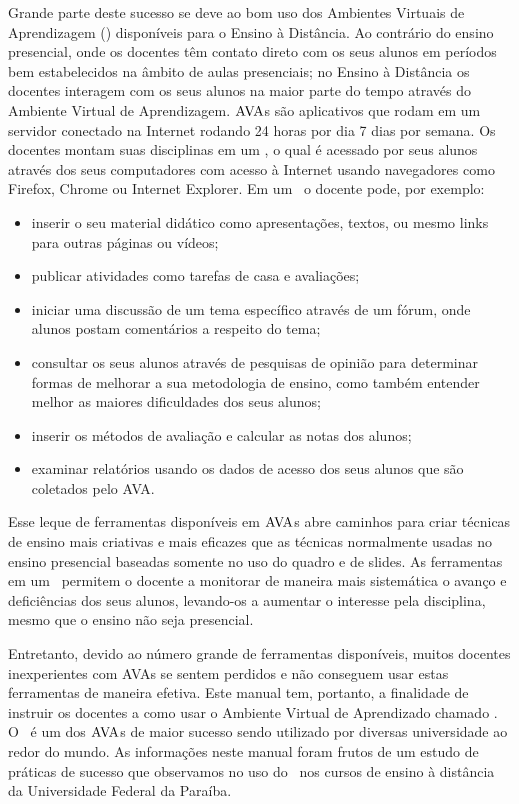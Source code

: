 Grande parte deste sucesso se deve ao bom uso dos Ambientes Virtuais de Aprendizagem (\ava) dispon{\' i}veis para
o Ensino {\` a} Dist{\^ a}ncia. Ao contr{\' a}rio do ensino presencial, onde os docentes t{\^ e}m contato direto 
com os seus alunos em per{\' i}odos bem estabelecidos na {\^ a}mbito de aulas presenciais; 
no Ensino {\` a} Dist{\^ a}ncia os docentes interagem com os seus alunos na maior parte do tempo 
atrav{\' e}s do Ambiente Virtual de Aprendizagem. $\hbox{AVA}$s s{\~ a}o aplicativos que rodam em um servidor 
conectado na Internet rodando 24 horas por dia 7 dias por semana. Os docentes montam suas disciplinas em um \ava, o qual {\' e} acessado 
por seus alunos atrav{\' e}s dos seus computadores com acesso {\` a} Internet usando navegadores como Firefox, Chrome ou Internet Explorer. 
Em um \ava\ o docente pode, por exemplo:
\begin{itemize}
 \item inserir o seu material did{\' a}tico como apresenta{\c c}{\~ o}es, textos, ou mesmo links para outras p{\' a}ginas ou v{\' i}deos;
 \item publicar atividades como tarefas de casa e avalia{\c c}{\~ o}es;
 \item iniciar uma discuss{\~ a}o de um tema espec{\' i}fico atrav{\' e}s de um f{\' o}rum, onde alunos postam coment{\' a}rios a 
 respeito do tema;
 \item consultar os seus alunos atrav{\' e}s de pesquisas de opini{\~ a}o para determinar
formas de melhorar a sua metodologia de ensino, como tamb{\' e}m entender melhor as
maiores dificuldades dos seus alunos;
 \item inserir os m{\' e}todos de avalia{\c c}{\~ a}o e calcular as notas dos alunos;
 \item examinar relat{\' o}rios usando os dados de acesso dos seus alunos que s{\~ a}o 
coletados pelo AVA.
\end{itemize}
Esse leque de ferramentas dispon{\' i}veis em $\hbox{AVA}$s abre caminhos para criar t{\' e}cnicas de ensino 
mais criativas e mais eficazes que as t{\' e}cnicas normalmente usadas no ensino presencial 
baseadas somente no uso do quadro e de slides. As ferramentas em um \ava\ permitem  
o docente a monitorar de maneira mais sistem{\' a}tica o avan{\c c}o e defici{\^ e}ncias dos seus alunos, 
levando-os a aumentar o interesse pela disciplina, mesmo que o ensino n{\~ a}o seja presencial. 

Entretanto, devido ao n{\' u}mero grande de ferramentas dispon{\' i}veis, muitos docentes inexperientes
com AVAs se sentem perdidos e n{\~ a}o conseguem usar estas ferramentas de maneira efetiva. 
Este manual tem, portanto, a finalidade de instruir os docentes a como usar o Ambiente Virtual de Aprendizado 
chamado \emph{\moodle}. O \moodle\ {\' e} um dos $\hbox{AVA}$s de maior sucesso sendo utilizado por diversas 
universidade ao redor do mundo. As informa{\c c}{\~ o}es neste manual foram frutos de um 
estudo de pr{\' a}ticas de sucesso que observamos no uso do \moodle\ 
nos cursos de ensino {\` a} dist{\^ a}ncia da Universidade Federal da Para{\' i}ba. 

